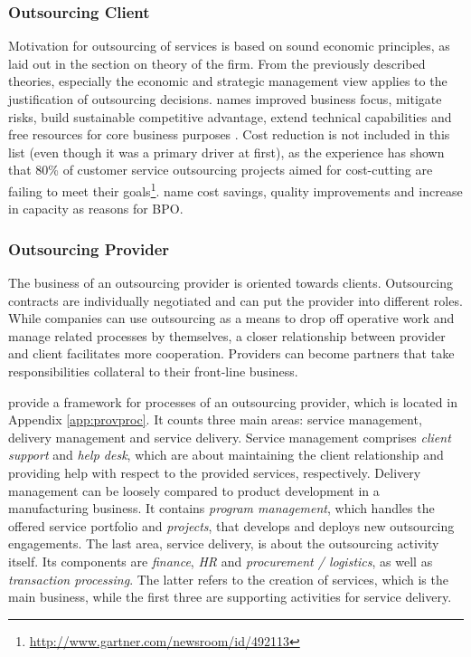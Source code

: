 		\subsubsection{Outsourcing Client}
		Motivation for outsourcing of services is based on sound economic principles, as laid out in the section on theory of the firm. From the previously described theories, especially the economic and strategic management view applies to the justification of outsourcing decisions. \citeauthor{bartell1998information} names improved business focus, mitigate risks, build sustainable competitive advantage, extend technical capabilities and free resources for core business purposes \citep{bartell1998information}. Cost reduction is not included in this list (even though it was a primary driver at first), as the experience has shown that 80\% of customer service outsourcing projects aimed for cost-cutting are failing to meet their goals\footnote{\cf \url{http://www.gartner.com/newsroom/id/492113}}. \citeauthor{gross2006} name cost savings, quality improvements and increase in capacity \citep[]{gross2006} as reasons for \acrshort{BPO}. 
	
		\subsubsection{Outsourcing Provider}
		
		The business of an outsourcing provider is oriented towards clients. Outsourcing contracts are individually negotiated and can put the provider into different roles. While companies can use outsourcing as a means to drop off operative work and manage related processes by themselves, a closer relationship between provider and client facilitates more cooperation. Providers can become partners that take responsibilities collateral to their front-line business. 
		
		\cite{schewe2007} provide a framework for processes of an outsourcing provider, which is located in Appendix \ref{app:provproc}. It counts three main areas: service management, delivery management and service delivery. Service management comprises \textit{client support} and \textit{help desk}, which are about maintaining the client relationship and providing help with respect to the provided services, respectively. Delivery management can be loosely compared to product development in a manufacturing business. It contains \textit{program management}, which handles the offered service portfolio and \textit{projects}, that develops and deploys new outsourcing engagements. The last area, service delivery, is about the outsourcing activity itself. Its components are \textit{finance}, \textit{HR} and \textit{procurement / logistics}, as well as \textit{transaction processing}. The latter refers to the creation of services, which is the main business, while the first three are supporting activities for service delivery. 
			
